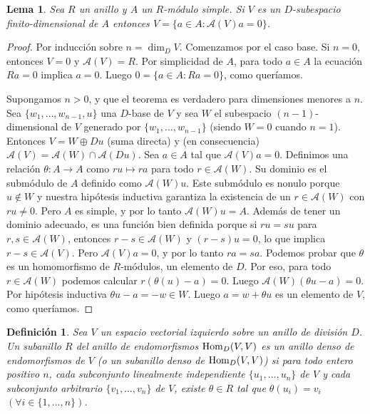\documentclass{report}
\newcommand{\Hom}{\textnormal{Hom}}
\newtheorem{lemma}{Lema}
\newtheorem{definition}{Definición}
\begin{document}
  \begin{lemma}\label{lemma:anihilatorLemma}
    Sea \(R\) un anillo y \(A\) un \(R\)-módulo simple.
    Si \(V\) es un \(D\)-subespacio finito-dimensional de \(A\) entonces \(V = \{a \in A : \mathcal{A}(V) a = 0\}\).
  \end{lemma}
  \begin{proof}
    Por inducción sobre \(n = \dim_D V\). 
    Comenzamos por el caso base.
    Si \(n = 0\), entonces \(V = 0\) y \(\mathcal{A}(V) = R\).
    Por simplicidad de \(A\), para todo \(a \in A\) la ecuación \(R a = 0\) implica \(a = 0\).
    Luego \(0 = \{a \in A : R a = 0\}\), como queríamos.

    Supongamos \(n > 0\), y que el teorema es verdadero para dimensiones menores a \(n\).
    Sea \(\{w_1, \dots, w_{n - 1}, u\}\) una \(D\)-base de \(V\) y sea \(W\) el subespacio \((n - 1)\)-dimensional de \(V\) generado por \(\{w_1, \dots, w_{n - 1}\}\) (siendo \(W = 0\) cuando \(n = 1\)).
    Entonces \(V = W \oplus D u\) (suma directa) y (en consecuencia) \(\mathcal{A}(V) = \mathcal{A}(W) \cap \mathcal{A}(D u)\).
    Sea \(a \in A\) tal que \(\mathcal{A}(V) a = 0\).
    Definimos una relación \(\theta : A \rightarrow A\) como \(r u \mapsto r a\) para todo \(r \in \mathcal{A}(W)\).
    Su dominio es el submódulo de \(A\) definido como \(\mathcal{A}(W) u\).
    Este submódulo es nonulo porque \(u \notin W\) y nuestra hipótesis inductiva garantiza la existencia de un \(r \in \mathcal{A}(W)\) con \(r u \neq 0\).
    Pero \(A\) es simple, y por lo tanto \(\mathcal{A}(W) u = A\).
    Además de tener un dominio adecuado, es una función bien definida porque si \(r u = s u\) para \(r, s \in \mathcal{A}(W)\), entonces \(r - s \in \mathcal{A}(W)\) y \((r - s) u = 0\), lo que implica \(r - s \in \mathcal{A}(V)\).
    Pero \(\mathcal{A}(V) a = 0\), y por lo tanto \(r a = s a\).
    Podemos probar que \(\theta\) es un homomorfismo de \(R\)-módulos, un elemento de \(D\).
    Por eso, para todo \(r \in \mathcal{A}(W)\) podemos calcular \(r (\theta(u) - a) = 0\).
    Luego \( \mathcal{A}(W) (\theta u - a) = 0\).
    Por hipótesis inductiva \(\theta u - a = - w \in W\).
    Luego \(a = w + \theta u\) es un elemento de \(V\), como queríamos.
  \end{proof}

  \begin{definition}
    Sea \(V\) un espacio vectorial izquierdo sobre un anillo de división \(D\).
    Un subanillo \(R\) del anillo de endomorfismos \(\Hom_D(V, V)\) es un \emph{anillo denso de endomorfismos} de \(V\) (o un \emph{subanillo denso} de \(\Hom_D(V, V)\)) si para todo entero positivo \(n\), cada subconjunto linealmente independiente \(\{u_1, \dots, u_n\}\) de \(V\) y cada subconjunto arbitrario \(\{v_1, \dots, v_n\}\) de \(V\), existe \(\theta \in R\) tal que \(\theta(u_i) = v_i\) \((\forall i \in \{1, \dots, n\})\).
  \end{definition}
\end{document}
